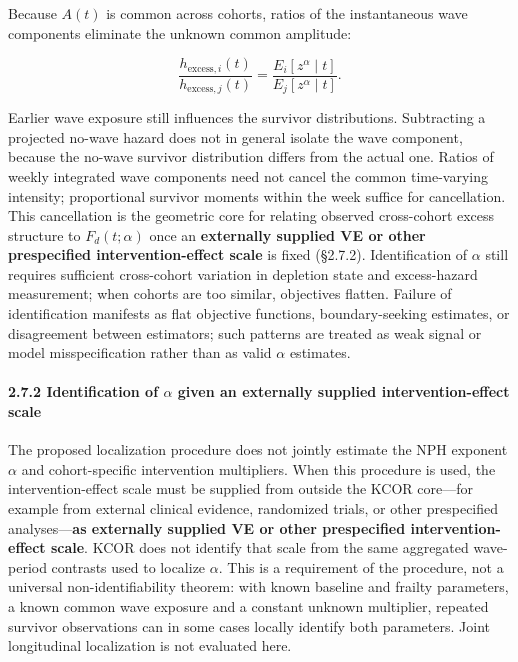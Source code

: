 \documentclass[
]{article}
\begin{document}
Because \(A(t)\) is common across cohorts, ratios of the instantaneous wave components eliminate the unknown common amplitude:

\[\frac{h_{\mathrm{excess},i}(t)}{h_{\mathrm{excess},j}(t)}
=
\frac{E_i[z^{\alpha}\mid t]}{E_j[z^{\alpha}\mid t]}.\]

Earlier wave exposure still influences the survivor distributions. Subtracting a projected no-wave hazard does not in general isolate the wave component, because the no-wave survivor distribution differs from the actual one. Ratios of weekly integrated wave components need not cancel the common time-varying intensity; proportional survivor moments within the week suffice for cancellation. This cancellation is the geometric core for relating observed cross-cohort excess structure to \(F_d(t;\alpha)\) once an \textbf{externally supplied VE or other prespecified intervention-effect scale} is fixed (§2.7.2). Identification of \(\alpha\) still requires sufficient cross-cohort variation in depletion state and excess-hazard measurement; when cohorts are too similar, objectives flatten. Failure of identification manifests as flat objective functions, boundary-seeking estimates, or disagreement between estimators; such patterns are treated as weak signal or model misspecification rather than as valid \(\alpha\) estimates.

\paragraph{\texorpdfstring{2.7.2 Identification of \(\alpha\) given an externally supplied intervention-effect scale}{2.7.2 Identification of \textbackslash alpha given an externally supplied intervention-effect scale}}\label{identification-of-alpha-given-an-externally-supplied-intervention-effect-scale}

The proposed localization procedure does not jointly estimate the NPH exponent \(\alpha\) and cohort-specific intervention multipliers. When this procedure is used, the intervention-effect scale must be supplied from outside the KCOR core---for example from external clinical evidence, randomized trials, or other prespecified analyses---\textbf{as externally supplied VE or other prespecified intervention-effect scale}. KCOR does not identify that scale from the same aggregated wave-period contrasts used to localize \(\alpha\). This is a requirement of the procedure, not a universal non-identifiability theorem: with known baseline and frailty parameters, a known common wave exposure and a constant unknown multiplier, repeated survivor observations can in some cases locally identify both parameters. Joint longitudinal localization is not evaluated here.
\end{document}
